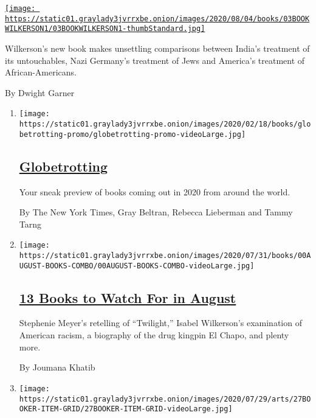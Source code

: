\begin{enumerate}
\begin{enumerate}
    \href{/2020/07/31/books/review-caste-isabel-wilkerson-origins-of-our-discontents.html}{\texttt{[image: https://static01.graylady3jvrrxbe.onion/images/2020/08/04/books/03BOOKWILKERSON1/03BOOKWILKERSON1-thumbStandard.jpg]}}

    Wilkerson's new book makes unsettling comparisons between India's
    treatment of its untouchables, Nazi Germany's treatment of Jews and
    America's treatment of African-Americans.

    By Dwight Garner
  \end{enumerate}
\end{enumerate}

\begin{enumerate}
\def\labelenumi{\arabic{enumi}.}
\item
  \texttt{[image: https://static01.graylady3jvrrxbe.onion/images/2020/02/18/books/globetrotting-promo/globetrotting-promo-videoLarge.jpg]}

  \hypertarget{globetrotting}{%
  \subsection{\texorpdfstring{\href{/interactive/2020/01/08/books/new-books-international.html}{Globetrotting}}{Globetrotting}}\label{globetrotting}}

  Your sneak preview of books coming out in 2020 from around the world.

  By The New York Times, Gray Beltran, Rebecca Lieberman and Tammy Tarng
\item
  \texttt{[image: https://static01.graylady3jvrrxbe.onion/images/2020/07/31/books/00AUGUST-BOOKS-COMBO/00AUGUST-BOOKS-COMBO-videoLarge.jpg]}

  \hypertarget{13-books-to-watch-for-in-august}{%
  \subsection{\texorpdfstring{\href{/2020/07/30/books/new-august-books.html}{13
  Books to Watch For in
  August}}{13 Books to Watch For in August}}\label{13-books-to-watch-for-in-august}}

  Stephenie Meyer's retelling of ``Twilight,'' Isabel Wilkerson's
  examination of American racism, a biography of the drug kingpin El
  Chapo, and plenty more.

  By Joumana Khatib
\item
  \texttt{[image: https://static01.graylady3jvrrxbe.onion/images/2020/07/29/arts/27BOOKER-ITEM-GRID/27BOOKER-ITEM-GRID-videoLarge.jpg]}


\end{enumerate}
